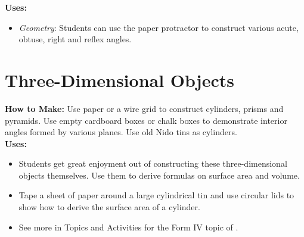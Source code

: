 \noindent\textbf{Uses:}
\begin{itemize}
\item \emph{Geometry}: Students can use the paper protractor to construct various acute, obtuse, right and reflex angles.
\end{itemize}

\section{Three-Dimensional Objects} \label{3dfigstools}
\textbf{How to Make:} Use paper or a wire grid to construct cylinders, prisms and pyramids. Use empty cardboard boxes or chalk boxes to demonstrate interior angles formed by various planes. Use old Nido tins as cylinders.\\

\noindent\textbf{Uses:}
\begin{itemize}
\item Students get great enjoyment out of constructing these three-dimensional objects themselves. Use them to derive formulas on surface area and volume.
\item Tape a sheet of paper around a large cylindrical tin and use circular lids to show how to derive the surface area of a cylinder.
\item See more in Topics and Activities for the Form IV topic of .
\end{itemize}